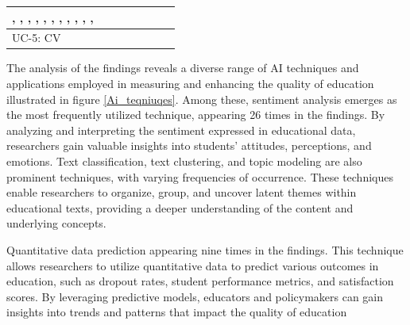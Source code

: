 \documentclass{svproc}
\begin{document}
\begin{table}[htbp]
\begin{tabular}{|l|p{0.45\linewidth}|}
\cite{Romanov}\cite{Research_on_the_Application_of_BP_Neural_Network_in_Vocal_Music_Teaching_Quality_Evaluation}, \cite{Design_of_online_teaching_quality_evaluation_system_for_Private_University_Research_based_on_deep_learning_algorithm}, \cite{BP_Neural_Network-Based_Evaluation_on_University_Teachers'_Teaching_Quality}, \cite{An_Improved_BP_Neural_Network-Based_Quality_Evaluation_Model_for_Chinese_International_Education_Teaching_Courses}, \cite{Evaluation_Model_of_PE_Teaching_Quality_Based_on_Active_Learning_Support_Vector_Machine}, \cite{Evaluation_System_of_Tourism_Psychology_Teaching_Quality_Based_on_Convolutional_Neural_Network}, \cite{An_Evaluation_Model_of_Moral_Education_Teaching_Quality_in_Universities_Based_on_System_Control_Theory}, \cite{Research_on_the_Application_of_BP_Neural_Network_in_the_Evaluation_of_College_Teaching_Quality}, \cite{The_Evaluation_and_Application_of_BP_Neural_Network_in_the_Multiple_Quality_Assurance_Paths_of_Higher_Education}, \cite{Evaluating_the_quality_of_teaching_in_higher_education_institutes_using_clustering_approach_and_set_pair_analysis}, \cite{Automatic_Rules_Generation_for_Teaching_Strategies_Improvement}, \cite{Exploring_Causes_for_the_Dropout_on_Massive_Open_Online_Courses} \\ \hline
UC-5: CV & \cite{Research_on_Evaluation_of_Online_Teaching_Effect_based_on_Deep_Learning_Technology} \\ \hline
\end{tabular}
\end{table}


The analysis of the findings reveals a diverse range of AI techniques and applications employed in measuring and enhancing the quality of education illustrated in figure \ref{Ai_teqniuqes}. Among these, sentiment analysis emerges as the most frequently utilized technique, appearing 26 times in the findings. By analyzing and interpreting the sentiment expressed in educational data, researchers gain valuable insights into students' attitudes, perceptions, and emotions.
Text classification, text clustering, and topic modeling are also prominent techniques, with varying frequencies of occurrence. These techniques enable researchers to organize, group, and uncover latent themes within educational texts, providing a deeper understanding of the content and underlying concepts.

Quantitative data prediction appearing nine times in the findings. This technique allows researchers to utilize quantitative data to predict various outcomes in education, such as dropout rates, student performance metrics, and satisfaction scores. By leveraging predictive models, educators and policymakers can gain insights into trends and patterns that impact the quality of education
\end{document}
